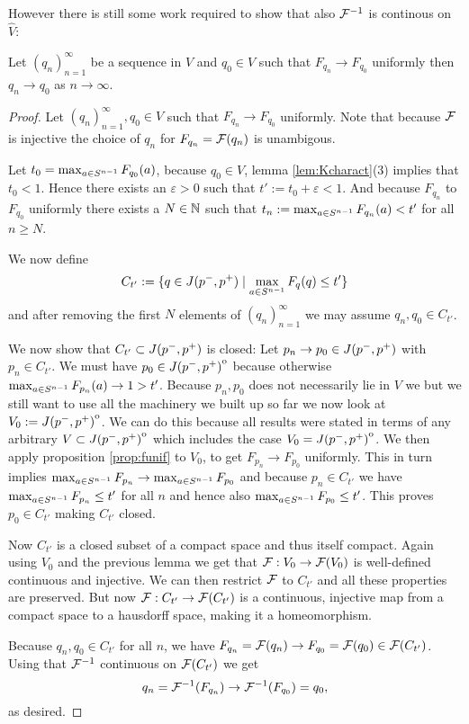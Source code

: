 However there is still some work required to show that also $\mathcal{F}^{-1}$ is continous on $\widehat{V}$:
\begin{proposition}\label{prop:frevcont} Let 
    $(q_n)_{n=1}^{\infty}$ be a sequence in $V$ and $q_0\in V$ such that $F_{q_n}\to F_{q_0}$ uniformly then $q_n \to q_0$ as $n\to \infty$.
\end{proposition}
\begin{proof}
    Let $(q_n)_{n=1}^\infty, q_0 \in V$ such that $F_{q_n}\to F_{q_0}$ uniformly. Note that because $\mathcal{F}$ is injective the choice of $q_n$ for $F_{q_n}=\mathcal{F}(q_n)$ is unambigous.

    Let $t_0 = \max_{a\in S^{n-1}} F_{q_0}(a)$, because $q_0\in V$, lemma \ref{lem:Kcharact}(3) implies that $t_0<1$. Hence there exists an $\varepsilon>0$ such that $t':=t_0 + \varepsilon < 1$. And because $F_{q_n}$ to $F_{q_0}$ uniformly there exists a $N\in \mathbb{N}$ such that $t_n:=\max_{a\in S^{n-1}} F_{q_n}(a)<t'$ for all $n \ge N$. 

    We now define 
    \[
        C_{t'}:=\{q\in J(p^-,p^+) \mid \max_{a\in S^{n-1}} F_q(q)\leq t'\}   
    \] and after removing the first $N$ elements of $(q_n)_{n=1}^\infty$ we may assume $q_n, q_0\in C_{t'}$.

    We now show that $C_{t'}\subset J(p^-,p^+)$ is closed: Let $p_n \to p_0 \in J(p^-,p^+)$ with $p_n \in C_{t'}$. We must have $p_0\in {\kern0ptJ(p^-,p^+)}^{\mathrm{o}}$ because otherwise $\max_{a\in S^{n-1}} F_{p_n}(a)\to 1 > t'$. Because $p_n, p_0$ does not necessarily lie in $V$ we but we still want to use all the machinery we built up so far we now look at $V_0:= {\kern0ptJ(p^-,p^+)}^{\mathrm{o}}$. We can do this because all results were stated in terms of any arbitrary $V\subset {\kern0ptJ(p^-,p^+)}^{\mathrm{o}}$ which includes the case $V_0 = {\kern0ptJ(p^-,p^+)}^{\mathrm{o}}$. We then apply proposition \ref{prop:funif} to $V_0$, to get $F_{p_n} \to F_{p_0}$ uniformly. This in turn implies $\max_{a\in S^{n-1}}F_{p_n} \to \max_{a\in S^{n-1}}F_{p_0}$ and because $p_n\in C_{t'}$ we have $\max_{a\in S^{n-1}}F_{p_n}\leq t'$ for all $n$ and hence also $\max_{a\in S^{n-1}}F_{p_0}\leq t'$. This proves $p_0\in C_{t'}$ making $C_{t'}$ closed.

    Now $C_{t'}$ is a closed subset of a compact space and thus itself compact. Again using $V_0$ and the previous lemma we get that $\mathcal{F}:V_0 \to \mathcal{F}(V_0)$ is well-defined continuous and injective. We can then restrict $\mathcal{F}$ to $C_{t'}$ and all these properties are preserved. But now $\mathcal{F}:C_{t'}\to \mathcal{F}(C_{t'})$ is a continuous, injective map from a compact space to a hausdorff space, making it a homeomorphism. 
    
    Because $q_n,q_0\in C_{t'}$ for all $n$, we have $F_{q_n}=\mathcal{F}(q_n)\to F_{q_0} = \mathcal{F}(q_0)\in \mathcal{F}(C_{t'})$. Using that $\mathcal{F}^{-1}$ continuous on $\mathcal{F}(C_{t'})$ we get
    \[
        q_n = \mathcal{F}^{-1}(F_{q_n}) \to \mathcal{F}^{-1}(F_{q_0}) = q_0,
    \] as desired.
\end{proof}

